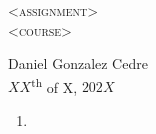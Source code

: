 


\begin{center}
    \textsc{\huge <assignment>}\\
    \textsc{\large <course>}
\end{center}
\begin{flushright}
    Daniel Gonzalez Cedre\\
    $XX$\textsuperscript{th} of X, $202X$
\end{flushright}

\begin{enumerate}
    \item
\end{enumerate}

